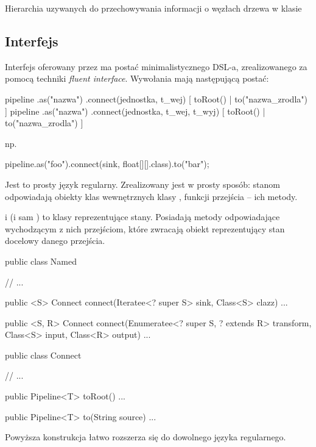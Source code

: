 {Hierarchia uzywanych do przechowywania informacji o węzłach drzewa w klasie }


\subsection{Interfejs}

Interfejs oferowany przez  ma postać minimalistycznego DSL-a, zrealizowanego za
pomocą techniki \textit{fluent interface}. Wywołania mają następującą postać:

\begin{java}
  pipeline {  .as("nazwa") } .connect(jednostka, t_wej) [ toRoot() | to("nazwa_zrodla") ]
  pipeline {  .as("nazwa") } .connect(jednostka, t_wej, t_wyj) [ toRoot() | to("nazwa_zrodla") ]
\end{java}

np. 

\begin{java}
  pipeline.as("foo").connect(sink, float[][].class).to("bar");
\end{java}

Jest to prosty język regularny. Zrealizowany jest w prosty sposób: stanom odpowiadają obiekty klas
wewnętrznych klasy , funkcji przejścia -- ich metody.


 i  (i sam ) to klasy reprezentujące stany. Posiadają
metody odpowiadające wychodzącym z nich przejściom, które zwracają obiekt reprezentujący stan
docelowy danego przejścia.

\begin{java}
public class Named {
    // ...

    public <S> Connect connect(Iteratee<? super S> sink, Class<S> clazz) { ... }

    public <S, R> Connect connect(Enumeratee<? super S, ? extends R> transform, 
        Class<S> input, Class<R> output) { ... }
}

public class Connect {
    // ...

    public Pipeline<T> toRoot() { ... }

    public Pipeline<T> to(String source) { ... }

}
\end{java}

\begin{Note}
  Powyższa konstrukcja łatwo rozszerza się do dowolnego języka regularnego. 
\end{Note}


